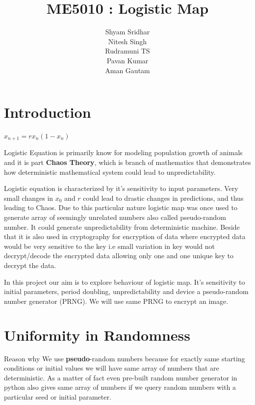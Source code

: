 \documentclass{report}
\title{\textbf{ME5010 : Logistic Map}}
\begin{document}
\author{Shyam Sridhar\\ Nitesh Singh \\ Rudramuni TS \\ Pavan Kumar \\ Aman Gautam }
\maketitle
\tableofcontents
\newpage
\section{Introduction}
\raggedright

\begin{center}$x_{n+1} = rx_n(1-x_n)$\end{center}
Logistic Equation is primarily know for modeling population growth of animals and it is part \textbf{Chaos Theory}, which is branch of mathematics that demonstrates how deterministic mathematical system could lead to unpredictability.

Logistic equation is characterized by it's sensitivity to input parameters. Very small changes in $x_0$ and $r$ could lead to drastic changes in predictions, and thus leading to Chaos. Due to this particular nature logistic map was once used to generate array of seemingly unrelated numbers also called pseudo-random number. It could generate unpredictability from deterministic machine. Beside that it is also used in cryptography for encryption of data where encrypted data would be very sensitive to the key i.e small variation in key would not decrypt/decode the encrypted data allowing only one and one unique key to decrypt the data.

In this project our aim is to explore behaviour of logistic map. It's sensitivity to initial parameters, period doubling, unpredictability and device a pseudo-random number generator (PRNG). We will use same PRNG to encrypt an image.

\section{Uniformity in Randomness}
\raggedright

Reason why We use \textbf{pseudo}-random numbers because for exactly same starting conditions or initial values we will have same array of numbers that are deterministic. As a matter of fact even pre-built random number generator in python also gives same array of numbers if we query random numbers with a particular seed or initial parameter.
\end{document}
